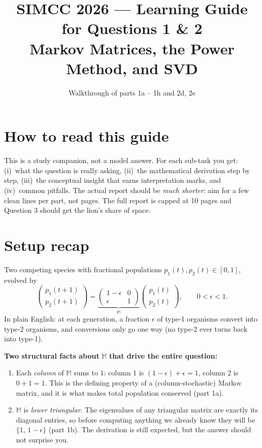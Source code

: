 \documentclass[12pt,a4paper]{article}
\title{\bfseries SIMCC 2026 --- Learning Guide for Questions 1 \& 2\\ \large Markov Matrices, the Power Method, and SVD}
\author{Walkthrough of parts 1a -- 1h and 2d, 2e}
\date{}
\newcommand{\M}{\mathbb{M}}
\begin{document}
\maketitle

\section*{How to read this guide}

This is a study companion, not a model answer. For each sub-task you get: (i)~what the question is really asking, (ii)~the mathematical derivation step by step, (iii)~the conceptual insight that earns interpretation marks, and (iv)~common pitfalls. The actual report should be \emph{much shorter}: aim for a few clean lines per part, not pages. The full report is capped at 10 pages and Question 3 should get the lion's share of space.

\section*{Setup recap}

Two competing species with fractional populations $p_1(t), p_2(t) \in [0,1]$, evolved by
\[
\begin{pmatrix} p_1(t+1) \\ p_2(t+1) \end{pmatrix}
= \underbrace{\begin{pmatrix} 1-\epsilon & 0 \\ \epsilon & 1 \end{pmatrix}}_{\M}
\begin{pmatrix} p_1(t) \\ p_2(t) \end{pmatrix}, \qquad 0 < \epsilon < 1.
\tag{1}
\]
In plain English: at each generation, a fraction $\epsilon$ of type-1 organisms convert into type-2 organisms, and conversions only go one way (no type-2 ever turns back into type-1).

\begin{insight}
\textbf{Two structural facts about }$\M$ \textbf{that drive the entire question:}
\begin{enumerate}[label=(\arabic*),leftmargin=*]
    \item Each \emph{column} of $\M$ sums to $1$: column 1 is $(1-\epsilon) + \epsilon = 1$, column 2 is $0 + 1 = 1$. This is the defining property of a (column-stochastic) Markov matrix, and it is what makes total population conserved (part 1a).
    \item $\M$ is \emph{lower triangular}. The eigenvalues of any triangular matrix are exactly its diagonal entries, so before computing anything we already know they will be $\{1,\, 1-\epsilon\}$ (part 1b). The derivation is still expected, but the answer should not surprise you.
\end{enumerate}
\end{insight}
\end{document}
